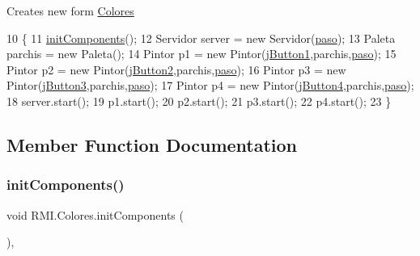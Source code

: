 Creates new form \mbox{\hyperlink{class_r_m_i_1_1_colores}{Colores}} 
\begin{DoxyCode}
10     \{
11         \mbox{\hyperlink{class_r_m_i_1_1_colores_a9d5b44a5476dfd578973b5944d4bff20}{initComponents}}();
12         Servidor server = \textcolor{keyword}{new} Servidor(\mbox{\hyperlink{class_r_m_i_1_1_colores_aad069517f2f10a0e1a58d42eac79bb76}{paso}});
13         Paleta parchis = \textcolor{keyword}{new} Paleta();
14         Pintor p1 = \textcolor{keyword}{new} Pintor(\mbox{\hyperlink{class_r_m_i_1_1_colores_add77873c88866ea978fcad21ad2eda75}{jButton1}},parchis,\mbox{\hyperlink{class_r_m_i_1_1_colores_aad069517f2f10a0e1a58d42eac79bb76}{paso}});
15         Pintor p2 = \textcolor{keyword}{new} Pintor(\mbox{\hyperlink{class_r_m_i_1_1_colores_ad8deec15488def53e7a4e617ae4253ad}{jButton2}},parchis,\mbox{\hyperlink{class_r_m_i_1_1_colores_aad069517f2f10a0e1a58d42eac79bb76}{paso}});
16         Pintor p3 = \textcolor{keyword}{new} Pintor(\mbox{\hyperlink{class_r_m_i_1_1_colores_a2ca1cf1514d7f93a94808c3c4d8f19e7}{jButton3}},parchis,\mbox{\hyperlink{class_r_m_i_1_1_colores_aad069517f2f10a0e1a58d42eac79bb76}{paso}});
17         Pintor p4 = \textcolor{keyword}{new} Pintor(\mbox{\hyperlink{class_r_m_i_1_1_colores_a07351e661898a4b3c4a1b0abae7fcbb5}{jButton4}},parchis,\mbox{\hyperlink{class_r_m_i_1_1_colores_aad069517f2f10a0e1a58d42eac79bb76}{paso}});
18         server.start();
19         p1.start();
20         p2.start();
21         p3.start();
22         p4.start();
23     \}
\end{DoxyCode}


\subsection{Member Function Documentation}
\mbox{\label{class_r_m_i_1_1_colores_a9d5b44a5476dfd578973b5944d4bff20}} 
\subsubsection{\texorpdfstring{init\+Components()}{initComponents()}}
{\footnotesize\ttfamily void R\+M\+I.\+Colores.\+init\+Components (\begin{DoxyParamCaption}{ }\end{DoxyParamCaption})\hspace{0.3cm}{\ttfamily [inline]}, {\ttfamily [private]}}

